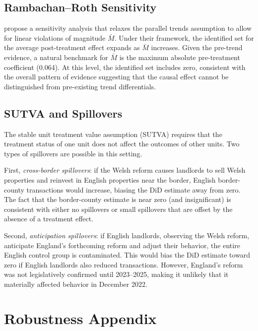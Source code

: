 \documentclass[12pt]{article}
\begin{document}
\subsection{Rambachan--Roth Sensitivity}

\citet{rambachan2023more} propose a sensitivity analysis that relaxes the parallel trends assumption to allow for linear violations of magnitude $\bar{M}$. Under their framework, the identified set for the average post-treatment effect expands as $\bar{M}$ increases. Given the pre-trend evidence, a natural benchmark for $\bar{M}$ is the maximum absolute pre-treatment coefficient (0.064). At this level, the identified set includes zero, consistent with the overall pattern of evidence suggesting that the causal effect cannot be distinguished from pre-existing trend differentials.

\subsection{SUTVA and Spillovers}

The stable unit treatment value assumption (SUTVA) requires that the treatment status of one unit does not affect the outcomes of other units. Two types of spillovers are possible in this setting.

First, \textit{cross-border spillovers}: if the Welsh reform causes landlords to sell Welsh properties and reinvest in English properties near the border, English border-county transactions would increase, biasing the DiD estimate away from zero. The fact that the border-county estimate is near zero (and insignificant) is consistent with either no spillovers or small spillovers that are offset by the absence of a treatment effect.

Second, \textit{anticipation spillovers}: if English landlords, observing the Welsh reform, anticipate England's forthcoming reform and adjust their behavior, the entire English control group is contaminated. This would bias the DiD estimate toward zero if English landlords also reduced transactions. However, England's reform was not legislatively confirmed until 2023--2025, making it unlikely that it materially affected behavior in December 2022.


\section{Robustness Appendix}
\label{app:robustness}
\end{document}
